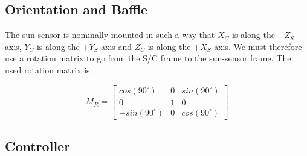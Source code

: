\subsection{Orientation and Baffle}

The sun sensor is nominally mounted in such a way that $X_C$ is along the $-Z_S$-axis, $Y_C$ is along the $+Y_S$-axis and $Z_C$ is along the $+X_S$-axis. 
We must therefore use a rotation matrix to go from the S/C frame to the sun-sensor frame.
The used rotation matrix is:

\begin{equation}
M_R = 
\begin{bmatrix}
    cos(90^\circ) & 0 & sin(90^\circ)\\
    0 & 1 & 0 \\
    -sin(90^\circ) & 0 & cos(90^\circ)
\end{bmatrix}	
\end{equation}







\subsection{Controller}






